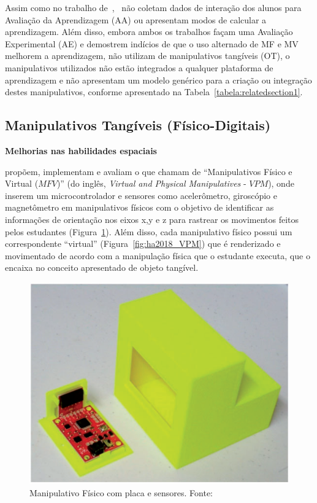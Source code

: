 Assim como no trabalho de~\cite{zacharia:2011},~\cite{Salehi:2014} não coletam dados de interação dos alunos para Avaliação da Aprendizagem (AA) ou apresentam modos de calcular a aprendizagem. Além disso, embora ambos os trabalhos façam uma Avaliação Experimental (AE) e demostrem indícios de que o uso alternado de MF e MV melhorem a aprendizagem, não utilizam de manipulativos tangíveis (OT), o manipulativos utilizados não estão integrados a qualquer plataforma de aprendizagem e não apresentam um modelo genérico para a criação ou integração destes manipulativos, conforme apresentado na Tabela~\ref{tabela:relatedsection1}.

\subsection{Manipulativos Tangíveis (Físico-Digitais)}

\textbf{Melhorias nas habilidades espaciais}

\cite{ha:2018} propõem, implementam e avaliam o que chamam de ``Manipulativos Físico e Virtual ($MFV$)'' (do inglês, \textit{Virtual and Physical Manipulatives} - $VPM$), onde inserem um microcontrolador e sensores como acelerômetro, giroscópio e magnetômetro em manipulativos físicos com o objetivo de identificar as informações de orientação nos eixos x,y e z para rastrear os movimentos feitos pelos estudantes (Figura~\ref{fig:ha2018}). Além disso, cada manipulativo físico possui um correspondente ``virtual'' (Figura~\ref{fig:ha2018_VPM}) que é renderizado e movimentado de acordo com a manipulação física que o estudante executa, que o encaixa no conceito apresentado de objeto tangível.

\begin{figure}[htb]
	\centering
	\includegraphics[width=0.7\linewidth]{chapters/works/ha2018.png}
	\caption{Manipulativo Físico com placa e sensores. Fonte:~\cite{ha:2018}}
	\label{fig:ha2018}
\end{figure}

